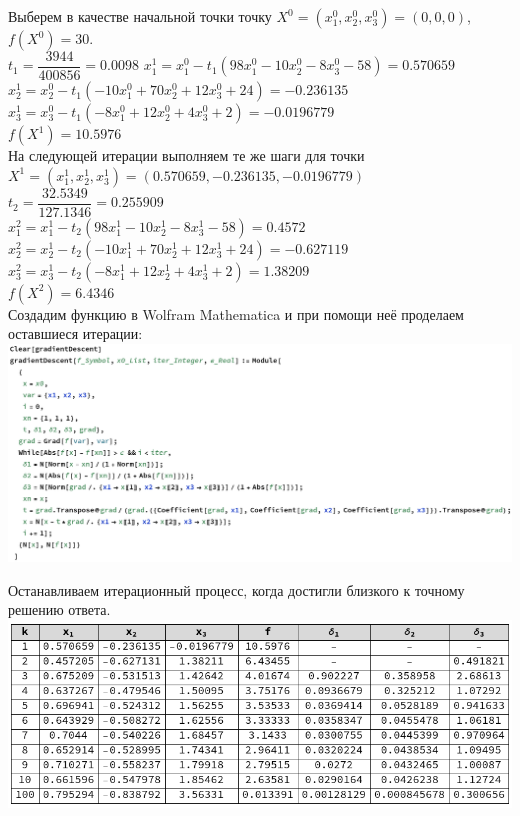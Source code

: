 \documentclass[14pt,a4paper,fleqn]{extarticle}
\begin{document}
	\normalsize Выберем в качестве начальной точки точку $X^0 = (x_1^0, x_2^0, x_3^0) = (0,0,0)$, $f(X^0) = 30$.\\
	
	$t_1 = \dfrac{3944}{400856} = 0.0098$
	\newpage
	$x_1^1 = x_1^0 - t_1(98x_1^0 - 10x_2^0 - 8x_3^0 - 58) = 0.570659$\\
	$x_2^1 = x_2^0 - t_1(-10x_1^0 + 70x_2^0 + 12x_3^0 + 24) = -0.236135$\\
	$x_3^1 = x_3^0 - t_1(-8x_1^0 + 12x_2^0 + 4x_3^0 + 2) = -0.0196779$\\
	
	$f(X^1) = 10.5976$\\
	
	На следующей итерации выполняем те же шаги для точки $X^1 = (x_1^1, x_2^1, x_3^1) = (0.570659, -0.236135, -0.0196779)$\\
	
	$t_2 = \dfrac{32.5349}{127.1346} = 0.255909$\\
	
	$x_1^2 = x_1^1 - t_2(98x_1^1 - 10x_2^1 - 8x_3^1 - 58) = 0.4572$\\
	$x_2^2 = x_2^1 - t_2(-10x_1^1 + 70x_2^1 + 12x_3^1 + 24) = -0.627119$\\
	$x_3^2 = x_3^1 - t_2(-8x_1^1 + 12x_2^1 + 4x_3^1 + 2) = 1.38209$\\
	
	$f(X^2) = 6.4346$\\
	
	Создадим функцию в Wolfram Mathematica и при помощи неё проделаем оставшиеся итерации:\\
	
	\includegraphics[scale=0.3]{wolfram}
	
	\newpage
	
	Останавливаем итерационный процесс, когда достигли близкого к точному решению ответа.\\
	
	\includegraphics[scale=0.55]{iterations}
	
\end{document}
